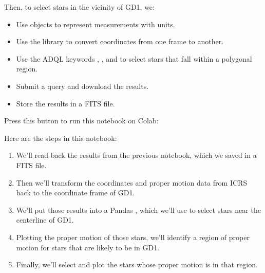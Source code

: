 \documentclass[letterpaper,10pt,english]{sphinxmanual}
\begin{document}
Then, to select stars in the vicinity of GD\sphinxhyphen{}1, we:
\begin{itemize}
\item {} 
Use  objects to represent measurements with units.

\item {} 
Use the  library to convert coordinates from one frame to another.

\item {} 
Use the ADQL keywords , , and  to select stars that fall within a polygonal region.

\item {} 
Submit a query and download the results.

\item {} 
Store the results in a FITS file.

\end{itemize}

Press this button to run this notebook on Colab:




Here are the steps in this notebook:
\begin{enumerate}
%
\item {} 
We’ll read back the results from the previous notebook, which we saved in a FITS file.

\item {} 
Then we’ll transform the coordinates and proper motion data from ICRS back to the coordinate frame of GD\sphinxhyphen{}1.

\item {} 
We’ll put those results into a Pandas , which we’ll use to select stars near the centerline of GD\sphinxhyphen{}1.

\item {} 
Plotting the proper motion of those stars, we’ll identify a region of proper motion for stars that are likely to be in GD\sphinxhyphen{}1.

\item {} 
Finally, we’ll select and plot the stars whose proper motion is in that region.

\end{enumerate}
\end{document}
